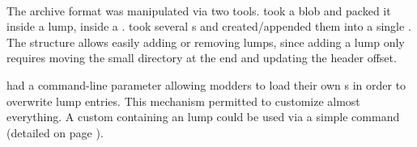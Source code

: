 \par
{}
\par
{}\\
\par
{}
\par
The archive format was manipulated via two tools.  took a blob and packed it inside a lump, inside a .  took several s and created/appended them into a single . The structure allows easily adding or removing lumps, since adding a lump only requires moving the small directory at the end and updating the header offset.\\
\par
{} had a command-line parameter allowing modders to load their own s in order to overwrite  lump entries. This mechanism permitted to customize almost everything. A custom  containing an  lump could be used via a simple  command (detailed on page \pageref{wad_detailled}).





